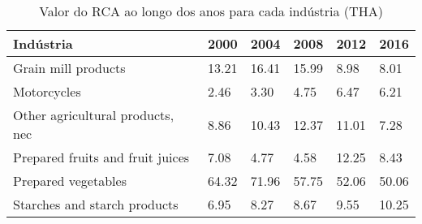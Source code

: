 \begin{table}
\centering
\caption{Valor do RCA ao longo dos anos para cada indústria (THA)}
\label{tab:ex3-tempo-THA}
\begin{tabular}{p{6cm}p{1.5cm}p{1.5cm}p{1.5cm}p{1.5cm}p{1.5cm}}
\toprule
                       Indústria &  2000 &  2004 &  2008 &  2012 &  2016 \\
\midrule
             Grain mill products & 13.21 & 16.41 & 15.99 &  8.98 &  8.01 \\
                     Motorcycles &  2.46 &  3.30 &  4.75 &  6.47 &  6.21 \\
Other agricultural products, nec &  8.86 & 10.43 & 12.37 & 11.01 &  7.28 \\
Prepared fruits and fruit juices &  7.08 &  4.77 &  4.58 & 12.25 &  8.43 \\
             Prepared vegetables & 64.32 & 71.96 & 57.75 & 52.06 & 50.06 \\
    Starches and starch products &  6.95 &  8.27 &  8.67 &  9.55 & 10.25 \\
\bottomrule
\end{tabular}
\end{table}
